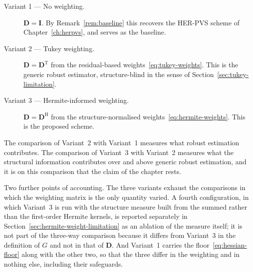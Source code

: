 \begin{description}
    \item[Variant 1 --- No weighting.] $\mathbf{D}=\mathbf{I}$. By
    Remark~\ref{rem:baseline} this recovers the HER-PVS scheme of
    Chapter~\ref{ch:herpvs}, and serves as the baseline.
    \item[Variant 2 --- Tukey weighting.] $\mathbf{D}=\mathbf{D}^{\mathrm{T}}$
    from the residual-based weights~\eqref{eq:tukey-weights}. This is the
    generic robust estimator, structure-blind in the sense of
    Section~\ref{sec:tukey-limitation}.
    \item[Variant 3 --- Hermite-informed weighting.]
    $\mathbf{D}=\mathbf{D}^{\mathrm{H}}$ from the structure-normalised
    weights~\eqref{eq:hermite-weights}. This is the proposed scheme.
\end{description}

The comparison of Variant~2 with Variant~1 measures what robust estimation
contributes. The comparison of Variant~3 with Variant~2 measures what the
structural information contributes over and above generic robust estimation,
and it is on this comparison that the claim of the chapter rests.

Two further points of accounting. The three variants exhaust the comparisons
in which the weighting matrix is the only quantity varied. A fourth
configuration, in which Variant~3 is run with the structure measure built from
the summed rather than the first-order Hermite kernels, is reported separately
in Section~\ref{sec:hermite-weight-limitation} as an ablation of the measure
itself; it is not part of the three-way comparison because it differs from
Variant~3 in the definition of $G$ and not in that of $\mathbf{D}$. And
Variant~1 carries the floor~\eqref{eq:hessian-floor} along with the other two,
so that the three differ in the weighting and in nothing else, including their
safeguards.

